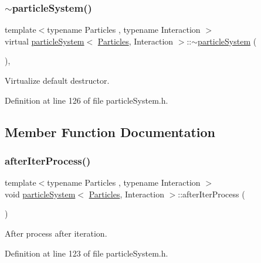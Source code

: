 \subsubsection{\texorpdfstring{$\sim$particle\+System()}{~particleSystem()}}
{\footnotesize\ttfamily template$<$typename Particles , typename Interaction $>$ \\
virtual \mbox{\hyperlink{classparticle_system}{particle\+System}}$<$ \mbox{\hyperlink{struct_particles}{Particles}}, Interaction $>$\+::$\sim$\mbox{\hyperlink{classparticle_system}{particle\+System}} (\begin{DoxyParamCaption}{ }\end{DoxyParamCaption})\hspace{0.3cm}{\ttfamily [inline]}, {\ttfamily [virtual]}}



Virtualize default destructor. 



Definition at line 126 of file particle\+System.\+h.



\subsection{Member Function Documentation}
\mbox{\label{classparticle_system_a12fa297e1f6674847c2b90761f30d336}} 
\subsubsection{\texorpdfstring{after\+Iter\+Process()}{afterIterProcess()}}
{\footnotesize\ttfamily template$<$typename Particles , typename Interaction $>$ \\
void \mbox{\hyperlink{classparticle_system}{particle\+System}}$<$ \mbox{\hyperlink{struct_particles}{Particles}}, Interaction $>$\+::after\+Iter\+Process (\begin{DoxyParamCaption}{ }\end{DoxyParamCaption})\hspace{0.3cm}{\ttfamily [inline]}}



After process after iteration. 



Definition at line 123 of file particle\+System.\+h.

